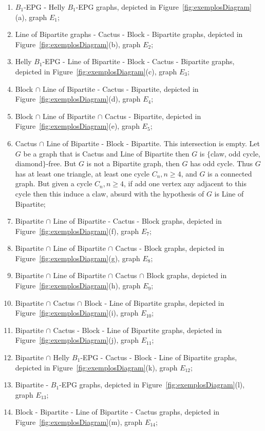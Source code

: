 \documentclass[9pt]{entcs}
\begin{document}
\begin{enumerate}[label=(\arabic*)]
    \item $B_1$-EPG  - Helly $B_1$-EPG graphs, depicted in Figure~\ref{fig:exemplosDiagram}(a), graph $E_1$;%
    
    \item Line of Bipartite graphs  - Cactus - Block - Bipartite graphs, depicted in Figure~\ref{fig:exemplosDiagram}(b), graph $E_2$;%
    \item Helly $B_1$-EPG - Line of Bipartite - Block - Cactus - Bipartite graphs, depicted in Figure~\ref{fig:exemplosDiagram}(c), graph $E_3$;%
    \item Block $\cap$ Line of Bipartite - Cactus - Bipartite, depicted in Figure~\ref{fig:exemplosDiagram}(d), graph $E_4$;%
    \item Block $\cap$ Line of Bipartite $\cap$  Cactus - Bipartite, depicted in Figure~\ref{fig:exemplosDiagram}(e), graph $E_5$;%
    \item Cactus $\cap$ Line of Bipartite - Block - Bipartite. This intersection is empty. Let $G$ be a graph that is Cactus and Line of Bipartite then $G$ is $\{$claw, odd cycle, diamond$\}$-free. But $G$ is not a Bipartite graph, then $G$ has odd cycle. Thus $G$ has at least one triangle, at least one cycle $C_n, n\geq 4$, and $G$ is a connected graph. But given a cycle $C_n, n\geq 4$, if add one vertex any adjacent to this cycle then this induce a claw, absurd with the hypothesis of $G$ is Line of Bipartite;%
    \item Bipartite $\cap$ Line of Bipartite  - Cactus - Block graphs, depicted in Figure~\ref{fig:exemplosDiagram}(f), graph $E_7$;%
    \item Bipartite $\cap$ Line of Bipartite $\cap$  Cactus - Block graphs, depicted in Figure~\ref{fig:exemplosDiagram}(g), graph $E_8$;%
    \item Bipartite $\cap$ Line of Bipartite $\cap$  Cactus $\cap$ Block graphs, depicted in Figure~\ref{fig:exemplosDiagram}(h), graph $E_9$;%
  \item Bipartite $\cap$  Cactus $\cap$ Block - Line of Bipartite graphs, depicted in Figure~\ref{fig:exemplosDiagram}(i), graph $E_{10}$;%
    \item Bipartite  $\cap$  Cactus - Block -  Line of Bipartite graphs, depicted in Figure~\ref{fig:exemplosDiagram}(j), graph $E_{11}$;%
     \item Bipartite $\cap$ Helly $B_1$-EPG - Cactus - Block -  Line of Bipartite graphs, depicted in Figure~\ref{fig:exemplosDiagram}(k), graph $E_{12}$;%
      \item Bipartite - $B_1$-EPG graphs, depicted in Figure~\ref{fig:exemplosDiagram}(l), graph $E_{13}$;%
      \item Block - Bipartite - Line of Bipartite  - Cactus graphs, depicted in Figure~\ref{fig:exemplosDiagram}(m), graph $E_{14}$;%
 

\end{enumerate}
\end{document}
